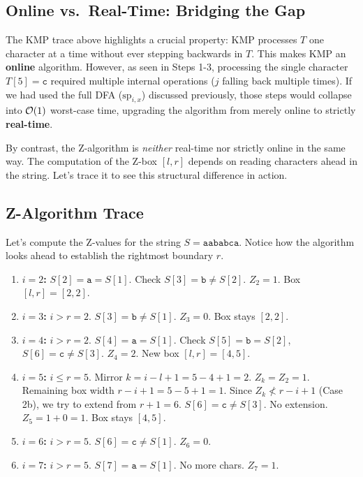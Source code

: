 \subsection{Online vs.\ Real-Time: Bridging the Gap}

The KMP trace above highlights a crucial property: KMP processes $T$ one character at a time without ever stepping backwards in $T$. This makes KMP an \textbf{online} algorithm. However, as seen in Steps 1-3, processing the single character $T[5]=\texttt{c}$ required multiple internal operations ($j$ falling back multiple times). If we had used the full DFA ($\mathrm{sp}_{i,x}$) discussed previously, those steps would collapse into $\mathcal{O}\!\left(1\right)$ worst-case time, upgrading the algorithm from merely online to strictly \textbf{real-time}.

By contrast, the Z-algorithm is \emph{neither} real-time nor strictly online in the same way. The computation of the Z-box $[l,r]$ depends on reading characters ahead in the string. Let's trace it to see this structural difference in action.

\subsection{Z-Algorithm Trace}

Let's compute the Z-values for the string $S = \texttt{aababca}$. 
Notice how the algorithm looks ahead to establish the rightmost boundary $r$.

\begin{enumerate}
  \item \textbf{$i=2$:} $S[2]=\texttt{a} = S[1]$. Check $S[3]=\texttt{b} \neq S[2]$. $Z_2 = 1$.
        Box $[l,r] = [2,2]$.
  \item \textbf{$i=3$:} $i > r=2$. $S[3]=\texttt{b} \neq S[1]$. $Z_3 = 0$. Box stays $[2,2]$.
  \item \textbf{$i=4$:} $i > r=2$. $S[4]=\texttt{a} = S[1]$. Check $S[5]=\texttt{b} = S[2]$, $S[6]=\texttt{c} \neq S[3]$. $Z_4 = 2$.
        New box $[l,r] = [4,5]$.
  \item \textbf{$i=5$:} $i \leq r=5$. Mirror $k = i-l+1 = 5-4+1 = 2$.
        $Z_k = Z_2 = 1$. Remaining box width $r-i+1 = 5-5+1 = 1$.
        Since $Z_k \not< r-i+1$ (Case 2b), we try to extend from $r+1 = 6$.
        $S[6]=\texttt{c} \neq S[3]$. No extension. $Z_5 = 1 + 0 = 1$. Box stays $[4,5]$.
  \item \textbf{$i=6$:} $i > r=5$. $S[6]=\texttt{c} \neq S[1]$. $Z_6 = 0$.
  \item \textbf{$i=7$:} $i > r=5$. $S[7]=\texttt{a} = S[1]$. No more chars. $Z_7 = 1$.
\end{enumerate}

